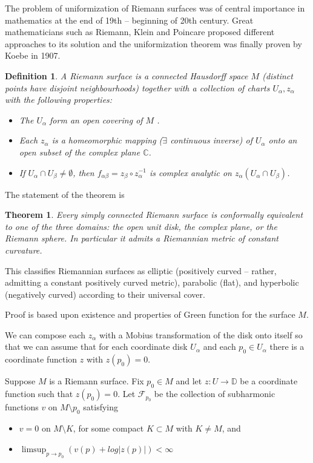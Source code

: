 \documentclass[12pt]{article}
\newtheorem{theorem}{Theorem}
\newtheorem{definition}{Definition}
\begin{document}
The problem of uniformization of Riemann surfaces was of central importance in mathematics at the
end of 19th -- beginning of 20th century. Great mathematicians such as Riemann, Klein and Poincare
proposed different approaches to its solution and the uniformization theorem was finally proven by
Koebe in 1907. 

\begin{definition}
  A Riemann surface is a connected Hausdorff space $M$ (distinct points have disjoint neighbourhoods) together with a collection
  of charts ${U_{\alpha} , z_{\alpha} }$ with the following properties:
  \begin{itemize}
  \item The $U_{\alpha}$ form an open covering of $M$ .
  \item Each $z_{\alpha}$ is a homeomorphic mapping ($\exists$ continuous inverse) of $U_{\alpha}$ onto an open subset of the complex plane $\mathbb{C}$.
  \item If $U_{\alpha}\cap  U_{\beta} \neq \emptyset$, then $f_{\alpha\beta} = z_{\beta}\circ  z_{\alpha}^{-1}$ is complex analytic on $z_{\alpha} (U_{\alpha} \cap U_{\beta} )$.
  \end{itemize}  
\end{definition}

The statement of the theorem is 
\begin{theorem}
  Every simply connected Riemann surface is conformally equivalent to one of the three domains: the
  open unit disk, the complex plane, or the Riemann sphere. In particular it admits a Riemannian
  metric of constant curvature.
\end{theorem} 

This classifies Riemannian surfaces as elliptic (positively curved -- rather, admitting a constant
positively curved metric), parabolic (flat), and hyperbolic (negatively curved) according to their
universal cover.

Proof is based upon existence and properties of Green function for the surface $M$.

 We can
 compose each $z_{\alpha}$ with a Mobius transformation of the disk onto itself so that we can
assume that for each coordinate disk $U_{\alpha}$ and each $p_{0}\in  U_{\alpha}$ there is a coordinate function
$z$ with $z (p_{0} ) = 0$.

     Suppose $M$ is a Riemann surface. Fix $p_{0}\in  M$ and let $z : U\to  \mathbb{D}$ be a coordinate
function such that $z(p_{0} ) = 0$. Let $\mathcal{F}_{p_{0}}$ be the collection of subharmonic
functions $v$ on $M \setminus p_{0}$ satisfying
\begin{itemize}
\item $v = 0$ on $M \setminus K$, for some compact $K\subset M$ with $K \neq M$, and
\item $\limsup_{p\to p_{0}} (v(p) + log |z(p)|) < \infty$
\end{itemize}
\end{document}
